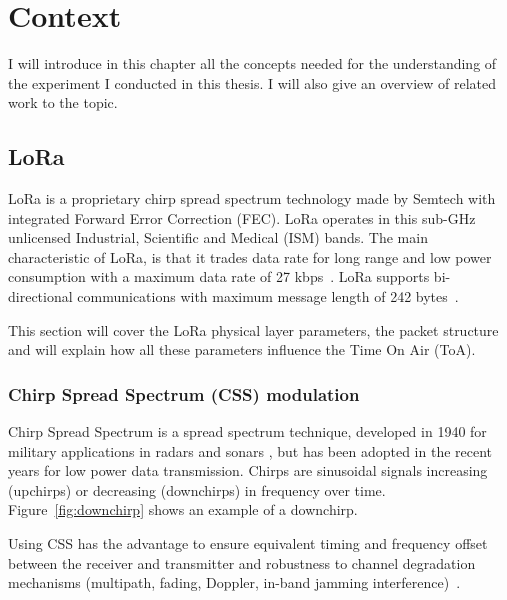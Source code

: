 \chapter{Context\label{section:context}}

I will introduce in this chapter all the concepts needed for the understanding
of the experiment I conducted in this thesis.
I will also give an overview of related work to the topic.

\section{LoRa\label{section:lora}}

LoRa is a proprietary chirp spread spectrum technology made by Semtech with
integrated Forward Error Correction (FEC).
LoRa operates in this sub-GHz unlicensed Industrial, Scientific and Medical
(ISM) bands.
The main characteristic of LoRa, is that it trades data rate for long range 
and low power consumption with a maximum data rate of 27 kbps~\cite{8030482}.
LoRa supports bi-directional communications with maximum message length of 242
bytes~\cite{loraalliance:lorawanspecification}.

This section will cover the LoRa physical layer parameters, the packet structure and 
will explain how all these parameters influence the Time On Air (ToA).

\subsection{Chirp Spread Spectrum (CSS) modulation}

Chirp Spread Spectrum is a spread spectrum technique, developed in 1940 for
military applications in radars and sonars \cite{semtech:modulationbasics}, but
has been adopted in the recent years for low power data transmission.
Chirps are sinusoidal signals increasing (upchirps) or decreasing (downchirps)
in frequency over time.
Figure~\ref{fig:downchirp} shows an example of a downchirp.

Using CSS has the advantage to ensure equivalent timing and frequency offset
between the receiver and transmitter and robustness to channel degradation
mechanisms (multipath, fading, Doppler, in-band jamming
interference)~\cite{semtech:modulationbasics}.


